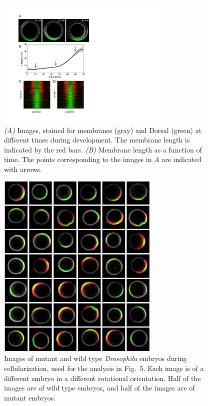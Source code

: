 \documentclass{pnastwo}
\newcommand{\fig}[0]{Fig.}
\begin{document}
\begin{figure}
\includegraphics[width=8.4cm, trim=0cm 5.6cm 0cm 0cm, clip]{SI_fig6}
\caption{{\it (A)} Images, stained for membranes (gray) and Dorsal (green) at different times during development. The membrane length is indicated by the red bars. {\it (B)} Membrane length as a function of time. The points corresponding to the images in {\it A} are indicated with arrows.}
\label{fig:membrane_compare}
\end{figure}

\begin{figure}
\includegraphics[height=9cm]{raw_data3}
\caption{Images of mutant and wild type {\it Drosophila} embryos during cellularization, used for the analysis in \fig~5. Each image is of a different embryo in a different rotational orientation. Half of the images are of wild type embryos, and half of the images are of mutant embryos.}
\end{figure}
\end{document}
